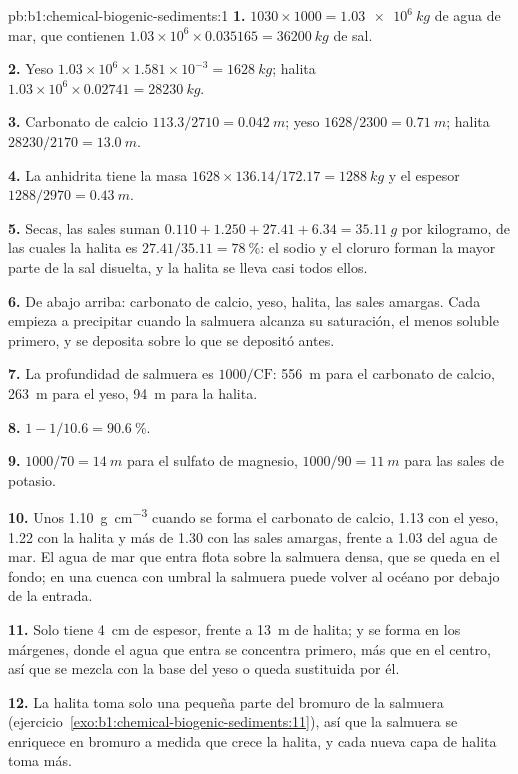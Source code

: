 \begin{solution}{pb:b1:chemical-biogenic-sediments:1}
\textbf{1.} $1030\times1000 = \qty{1.03e6}{kg}$ de agua de mar, que contienen
$1.03\times10^6\times0.035165 = \qty{36200}{kg}$ de sal.

\textbf{2.} Yeso $1.03\times10^6\times1.581\times10^{-3} = \qty{1628}{kg}$;
halita $1.03\times10^6\times0.02741 = \qty{28230}{kg}$.

\textbf{3.} Carbonato de calcio $113.3/2710 = \qty{0.042}{m}$; yeso $1628/2300 =
\qty{0.71}{m}$; halita $28230/2170 = \qty{13.0}{m}$.

\textbf{4.} La anhidrita tiene la masa $1628\times136.14/172.17 =
\qty{1288}{kg}$ y el espesor $1288/2970 = \qty{0.43}{m}$.

\textbf{5.} Secas, las sales suman $0.110 + 1.250 + 27.41 + 6.34 = \qty{35.11}{g}$ por kilogramo, de las cuales la halita es $27.41/35.11 = \qty{78}{\%}$: el sodio y el cloruro
forman la mayor parte de la sal disuelta, y la halita se lleva casi todos ellos.

\textbf{6.} De abajo arriba: carbonato de calcio, yeso, halita, las sales amargas. Cada  empieza a precipitar cuando la salmuera alcanza su saturación, el menos soluble primero, y
se deposita sobre lo que se depositó antes.

\textbf{7.} La profundidad de salmuera es $1000/\mathrm{CF}$: \qty{556}{m} para el carbonato de calcio, \qty{263}{m} para el yeso, \qty{94}{m} para la halita.

\textbf{8.} $1 - 1/10.6 = \qty{90.6}{\%}$.

\textbf{9.} $1000/70 = \qty{14}{m}$ para el sulfato de magnesio, $1000/90 = \qty{11}{m}$ para las sales de potasio.

\textbf{10.} Unos \qty{1.10}{g.cm^{-3}} cuando se forma el carbonato de calcio, 1.13 con el yeso, 1.22 con la halita y más de 1.30 con las sales amargas, frente a 1.03 del agua de mar. El agua
de mar que entra flota sobre la salmuera densa, que se queda en el fondo; en una cuenca con umbral la salmuera puede volver al océano por debajo de la entrada.

\textbf{11.} Solo tiene \qty{4}{cm} de espesor, frente a \qty{13}{m} de halita; y se forma en los márgenes, donde el agua que entra se concentra primero, más que en el centro, así que se mezcla con la base del yeso o queda sustituida por él.

\textbf{12.} La halita toma solo una pequeña parte del bromuro de la salmuera (ejercicio~\ref{exo:b1:chemical-biogenic-sediments:11}), así que la salmuera se enriquece en bromuro a medida que crece la halita, y cada nueva capa de halita toma más.


\end{solution}
